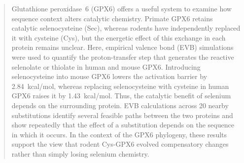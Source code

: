 \begin{abstract}
Glutathione peroxidase~6 (GPX6) offers a useful system to examine how sequence context alters catalytic chemistry. Primate GPX6 retains catalytic selenocysteine (Sec), whereas rodents have independently replaced it with cysteine (Cys), but the energetic effect of this exchange in each protein remains unclear. Here, empirical valence bond (EVB) simulations were used to quantify the proton-transfer step that generates the reactive selenolate or thiolate in human and mouse GPX6. Introducing selenocysteine into mouse GPX6 lowers the activation barrier by 2.84~kcal/mol, whereas replacing selenocysteine with cysteine in human GPX6 raises it by 1.43~kcal/mol. Thus, the catalytic benefit of selenium depends on the surrounding protein. EVB calculations across 20 nearby substitutions identify several feasible paths between the two proteins and show repeatedly that the effect of a substitution depends on the sequence in which it occurs. In the context of the GPX6 phylogeny, these results support the view that rodent Cys-GPX6 evolved compensatory changes rather than simply losing selenium chemistry.
\end{abstract}
